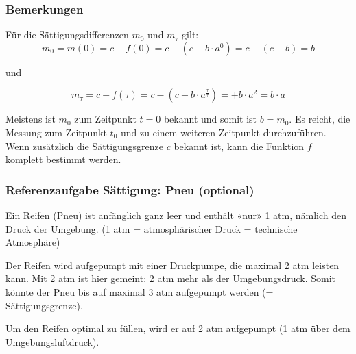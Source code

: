 \subsubsection{Bemerkungen}
\begin{bemerkung}{}{}
  Für die Sättigungsdifferenzen $m_0$ und $m_\tau$ gilt:
  $$m_0 = m(0) = c- f(0) = c- (c-b\cdot{}a^0) = c-(c-b) = b$$

  und 

  $$m_\tau = c- f(\tau) = c - (c-b\cdot{}a^{\frac{\tau}{\tau}}) = +b
  \cdot{} a^2 = b\cdot{}a$$


\end{bemerkung}



\begin{bemerkung}{}{}
Meistens ist $m_0$ zum Zeitpunkt $t=0$ bekannt und somit ist $b=m_0$. Es reicht, die Messung zum Zeitpunkt $t_0$ und zu einem weiteren Zeitpunkt durchzuführen. Wenn zusätzlich die Sättigungsgrenze $c$ bekannt ist, kann die Funktion $f$ komplett bestimmt werden.
\end{bemerkung} 

\newpage
\subsubsection{Referenzaufgabe Sättigung: Pneu (optional)}

Ein Reifen (Pneu) ist anfänglich ganz leer und enthält «nur» 1 atm, nämlich den
Druck der Umgebung. (1 atm = atmosphärischer Druck = technische Atmosphäre) 

Der Reifen wird aufgepumpt mit einer Druckpumpe, die maximal 2 atm
leisten
kann. Mit 2 atm ist hier gemeint: 2 atm mehr als der
Umgebungsdruck. Somit könnte der Pneu bis auf maximal 3 atm aufgepumpt
werden (= Sättigungsgrenze).

Um den Reifen optimal zu füllen, wird er auf 2 atm aufgepumpt (1 atm
über dem Umgebungsluftdruck).

